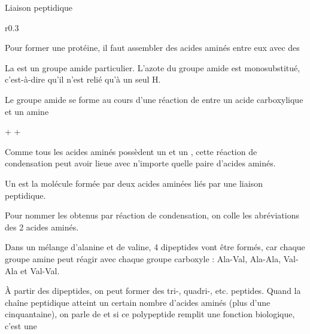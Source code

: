 \begin{doc}{Liaison peptidique}
  \begin{wrapfigure}[3]{r}{0.3\linewidth}
    \centering

  \end{wrapfigure}
  
  Pour former une protéine, il faut assembler des acides aminés entre eux avec des 

  \begin{importants}
    La  est un groupe amide particulier.
    L'azote du groupe amide est monosubstitué, c'est-à-dire qu'il n'est relié qu'à un seul H.
  \end{importants}

  Le groupe amide se forme au cours d'une réaction de  entre un acide carboxylique et un amine
  \vspace*{-4pt}
  
  \begin{center}
     +   
    \reaction
     +
    \eau
  \end{center}
  \vspace*{-4pt}

  Comme tous les acides aminés possèdent un  et un , cette réaction de condensation peut avoir lieue avec n'importe quelle paire d'acides aminés.

  \begin{importants}
    Un  est la molécule formée par deux acides aminées liés par une liaison peptidique.
    
    Pour nommer les  obtenus par réaction de condensation, on colle les abréviations des 2 acides aminés.
  \end{importants}

  Dans un mélange  d'alanine et de valine, 4 dipeptides vont être formés, car chaque groupe amine peut réagir avec chaque groupe carboxyle :
  Ala-Val, Ala-Ala, Val-Ala et Val-Val.

  \begin{importants}  
    À partir des dipeptides, on peut former des tri-, quadri-, etc. peptides.
    Quand la chaîne peptidique atteint un certain nombre d'acides aminés (plus d'une cinquantaine), on parle de  et si ce polypeptide remplit une fonction biologique, c'est une 
  \end{importants}
\end{doc}

